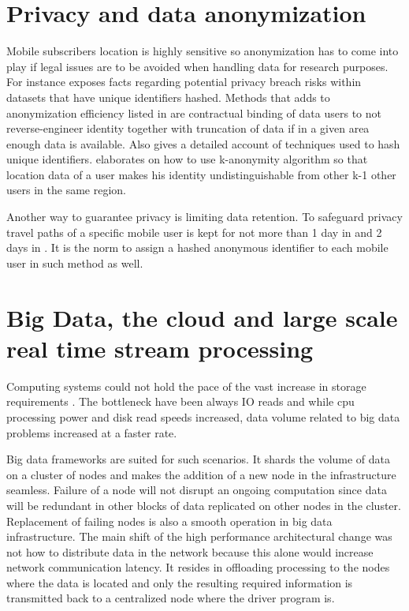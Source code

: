 \documentclass[12pt, a4paper]{report}
\theoremstyle{definition}
\theoremstyle{definition}%
\theoremstyle{definition}%
\theoremstyle{definition}%
\theoremstyle{definition}%
\theoremstyle{definition}%
\begin{document}
\section{Privacy and data anonymization} \label{data_anonymization} 


Mobile subscribers location is highly sensitive so anonymization has to come into play if legal issues are to be avoided when handling data for research purposes. For instance \cite{Laurila2012} exposes facts regarding potential privacy breach risks within datasets that have unique identifiers hashed. Methods that adds to anonymization efficiency listed in \cite{Laurila2012} are contractual binding of data users to not reverse-engineer identity together with truncation of data if in a given area enough data is available. Also \cite{Laurila2012} gives a detailed account of techniques used to hash unique identifiers. \cite{Shin} elaborates on how to use k-anonymity algorithm so that location data of a user makes his identity undistinguishable from other k-1 other users in the same region.

Another way to guarantee privacy is limiting data retention. To safeguard privacy travel paths of a specific mobile user is kept for not more than 1 day in \cite{Hoteit2014} and 2 days in \cite{Calabrese2013}. It is the norm to assign a hashed anonymous identifier to each mobile user in such method as well.



\section{Big Data, the cloud and large scale real time stream processing} \label{background_big_data}

Computing systems could not hold the pace of the vast increase in storage requirements \cite{Liu2014}. The bottleneck have been always IO reads and while cpu processing power and disk read speeds increased, data volume related to big data problems increased at a faster rate. 

Big data frameworks are suited for such scenarios. It shards the volume of data on a cluster of nodes and makes the addition of a new node in the infrastructure seamless. Failure of a node will not disrupt an ongoing computation since data will be redundant in other blocks of data replicated on other nodes in the cluster. Replacement of failing nodes is also a smooth operation in big data infrastructure. The main shift of the high performance architectural change was not how to distribute data in the network because this alone would increase network communication latency. It resides in offloading processing to the nodes where the data is located and only the resulting required information is transmitted back to a centralized node where the driver program is.
\end{document}
